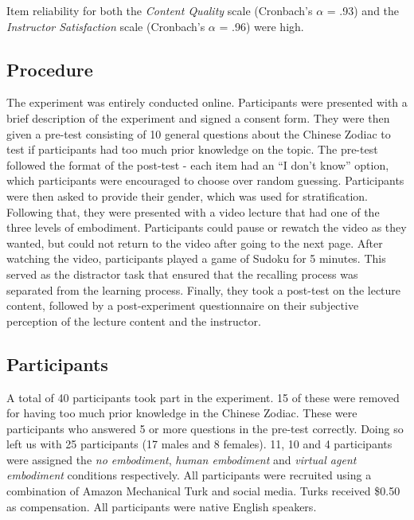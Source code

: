 \documentclass{sigchi}
\begin{document}
Item reliability for both the \textit{Content Quality} scale (Cronbach's $\alpha$ = .93) and the \textit{Instructor Satisfaction} scale (Cronbach's $\alpha$ = .96) were high.

\subsection{Procedure}
The experiment was entirely conducted online. Participants were presented with a brief description of the experiment and signed a consent form. They were then given a pre-test consisting of 10 general questions about the Chinese Zodiac to test if participants had too much prior knowledge on the topic. The pre-test followed the format of the post-test - each item had an ``I don't know'' option, which participants were encouraged to choose over random guessing. Participants were then asked to provide their gender, which was used for stratification. Following that, they were presented with a video lecture that had one of the three levels of embodiment. Participants could pause or rewatch the video as they wanted, but could not return to the video after going to the next page. After watching the video, participants played a game of Sudoku for 5 minutes. This served as the distractor task that ensured that the recalling process was separated from the learning process. Finally, they took a post-test on the lecture content, followed by a post-experiment questionnaire on their subjective perception of the lecture content and the instructor.

\subsection{Participants}
A total of 40 participants took part in the experiment. 15 of these were removed for having too much prior knowledge in the Chinese Zodiac. These were participants who answered 5 or more questions in the pre-test correctly. Doing so left us with 25 participants (17 males and 8 females). 11, 10 and 4 participants were assigned the \textit{no embodiment}, \textit{human embodiment} and \textit{virtual agent embodiment} conditions respectively. All participants were recruited using a combination of Amazon Mechanical Turk and social media. Turks received \$0.50 as compensation. All participants were native English speakers.

\end{document}
